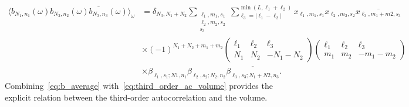 \documentclass[english,11pt]{article}
\newcommand{\1}{\mathbf{1}}
\numberwithin{equation}{section}
\theoremstyle{plain}
\theoremstyle{definition}
\theoremstyle{remark}
\theoremstyle{plain}
\theoremstyle{remark}
\theoremstyle{plain}
\theoremstyle{plain}
\newcommand{\tamir}{x}
\begin{document}
\begin{align} \label{eq:b_average}
\langle b_{N_1,n_1}(\omega)b_{N_2,n_2}(\omega)\overline{b_{N_3,n_3}}(\omega)\rangle_{\omega} &= \delta_{N_3,N_1+N_2}\sum_{\substack{\ell_1,m_1,s_1\\\ell_2,m_2,s_2\\s_3}}\sum_{\ell_3=|\ell_1-\ell_2|}^{\min(L,\ell_1+\ell_2)}\tamir_{\ell_1,m_1,s_1}\tamir_{\ell_2,m_2,s_2}\overline{\tamir_{\ell_3,m_1+m2,s_3}}\nonumber\\
&\times (-1)^{N_1+N_2+m_1+m_2}\left(\begin{array}{ccc}\ell_1 & \ell_2  & \ell_3\\ N_1 & N_2 & -N_1-N_2\end{array}\right)\left(\begin{array}{ccc}\ell_1 & \ell_2  & \ell_3\\ m_1 & m_2 & -m_1-m_2\end{array}\right)\\
&\times \beta_{\ell_1,s_1;N1,n_1}\beta_{\ell_2,s_2;N_2,n_2}\overline{\beta_{\ell_3,s_3;N_1+N2,n_3}}. \nonumber
\end{align}
Combining~\eqref{eq:b_average} with~\eqref{eq:third_order_ac_volume} provides the explicit relation between the third-order autocorrelation and the volume.   
\end{document}
